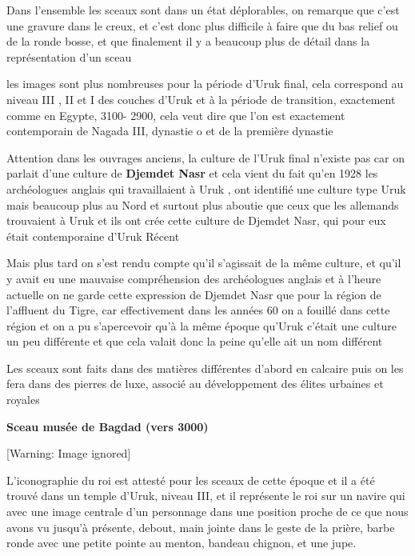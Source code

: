 \documentclass[a4paper,10pt]{article}
\newcommand{\DirImg}{../img/FaivreMartin/}
\begin{document}
Dans l'ensemble les sceaux sont dans un état
déplorables, on remarque que c'est une gravure dans le
creux, et c'est donc plus difficile à faire que du bas
relief ou de la ronde bosse, et que finalement il y a beaucoup plus de
détail dans la représentation d'un sceau

les images sont plus nombreuses pour la période d'Uruk
final, cela correspond au niveau III , II et I des couches
d'Uruk et à la période de transition, exactement comme
en Egypte, 3100- 2900, cela veut dire que l'on est
exactement contemporain de Nagada III, dynastie o et de la première
dynastie

Attention dans les ouvrages anciens, la culture de
l'Uruk final n'existe pas car on
parlait d'une culture de \textbf{Djemdet Nasr} et cela
vient du fait qu'en 1928 les archéologues anglais qui
travaillaient à Uruk , ont identifié une culture type Uruk mais
beaucoup plus au Nord et surtout plus aboutie que ceux que les
allemands trouvaient à Uruk et ils ont crée cette culture de Djemdet
Nasr, qui pour eux était contemporaine d'Uruk Récent

Mais plus tard on s'est rendu compte
qu'il s'agissait de la même culture,
et qu'il y avait eu une mauvaise compréhension des
archéologues anglais et à l'heure actuelle on ne garde
cette expression de Djemdet Nasr que pour la région de
l'affluent du Tigre, car effectivement dans les années
60  on a fouillé dans cette région et on a pu
s'apercevoir qu'à la même époque
qu'Uruk c'était une culture un peu
différente et que cela valait donc la peine qu'elle
ait un nom différent

Les sceaux sont faits dans des matières différentes
d'abord en calcaire puis on les fera dans des pierres
de luxe, associé  au développement des élites urbaines et royales

\textbf{Sceau musée de Bagdad  (vers 3000)}

  [Warning: Image ignored] %
 

L'iconographie du roi est attesté pour les sceaux de
cette époque  et il a été trouvé dans un temple
d'Uruk, niveau III, et il représente le roi sur un
navire qui avec une image centrale d'un personnage
dans une position proche de ce que nous avons vu
jusqu'à présente, debout, main jointe dans le geste de
la prière, barbe ronde avec une petite pointe au menton,  bandeau
chignon, et une jupe.
\end{document}

